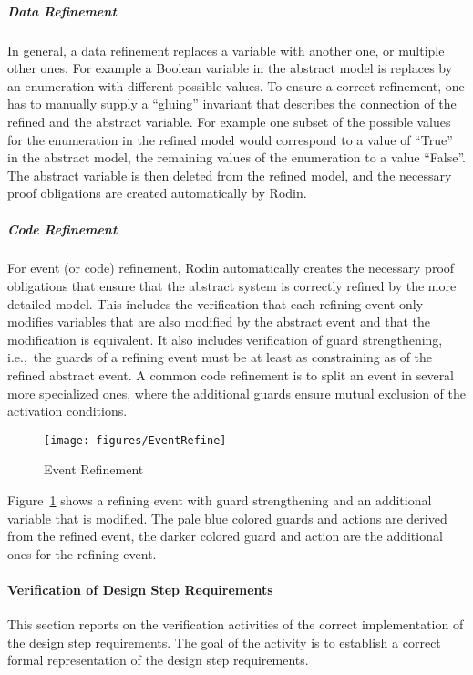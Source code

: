 \subparagraph{Data Refinement}
\label{sec:data-refinement}

In general, a data refinement replaces a variable with another one, or multiple
other ones. For example a Boolean variable in the abstract model is replaces by
an enumeration with different possible values. To ensure a correct refinement,
one has to manually supply a ``gluing'' invariant that describes the connection
of the refined and the abstract variable. For example one subset of the possible
values for the enumeration in the refined model would correspond to a value of
``True'' in the abstract model, the remaining values of the enumeration to a
value ``False''. The abstract variable is then deleted from the refined model,
and the necessary proof obligations are created automatically by Rodin.


\subparagraph{Code Refinement}
\label{sec:code-refinement}

For event (or code) refinement, Rodin automatically creates the necessary proof
obligations that ensure that the abstract system is correctly refined by the
more detailed model. This includes the verification that each refining event
only modifies variables that are also modified by the abstract event and that
the modification is equivalent. It also includes verification of guard
strengthening, i.e.,\ the guards of a refining event must be at least as
constraining as of the refined abstract event. A common code refinement is to
split an event in several more specialized ones, where the additional guards
ensure mutual exclusion of the activation conditions.

\begin{figure}[ht]
  \centering
  \texttt{[image: figures/EventRefine]}
  \caption{Event Refinement}
  \label{fig:event-refine}
\end{figure}

Figure~\ref{fig:event-refine} shows a refining event with guard strengthening
and an additional variable that is modified. The pale blue colored guards and
actions are derived from the refined event, the darker colored guard and action
are the additional ones for the refining event.


\paragraph{Verification of Design Step Requirements}
\label{sec:verif-design-step}

This section reports on the verification activities of the correct
implementation of the design step requirements. The goal of the activity is to
establish a correct formal representation of the design step requirements.

